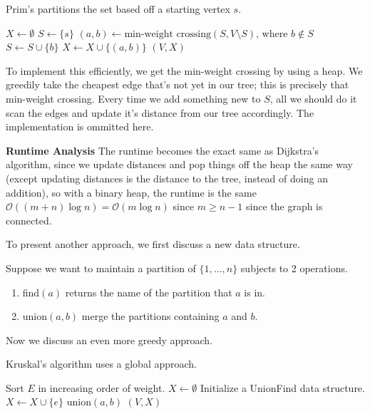 \begin{algothm}
    Prim's partitions the set based off a starting vertex $s$.
    \begin{algorithmic}
            \State $X \gets \emptyset$
            \State $S \gets \{s\}$
                \State $(a, b) \gets \text{min-weight crossing} (S, V\setminus S)$, where $b \notin S$
                \State $S \gets S \cup \{b\}$
                \State $X \gets X \cup \{(a, b)\}$
            \EndFor
            \State \Return $(V, X)$
        \EndFunction
    \end{algorithmic}

    To implement this efficiently, we get the min-weight crossing by using a heap. We greedily take the cheapest edge that's
    not yet in our tree; this is precisely that min-weight crossing. Every time we add something new to $S$, all we should do it scan the edges and
    update it's distance from our tree accordingly. The implementation is ommitted here.

    \textbf{Runtime Analysis} The runtime becomes the exact same as Dijkstra's algorithm, since we update distances and pop things off the heap
    the same way (except updating distances is the distance to the tree, instead of doing an addition), so with a binary heap,
    the runtime is the same $\mathcal{O}((m + n) \log n) = \mathcal{O}(m \log n)$ since $m \geq n - 1$ since the graph is connected.
\end{algothm}

To present another approach, we first discuss a new data structure.
\begin{note} 
    Suppose we want to maintain a partition of $\{1, \dots, n\}$ subjects to 2 operations.
    \begin{enumerate}
        \item find$(a)$ returns the name of the partition that $a$ is in.
        \item union$(a, b)$ merge the partitions containing $a$ and $b$.
    \end{enumerate}
\end{note}

Now we discuss an even more greedy approach.

\begin{algothm}
    Kruskal's algorithm uses a global approach.
    \begin{algorithmic}
            \State Sort $E$ in increasing order of weight.
            \State $X \gets \emptyset$
            \State Initialize a UnionFind data structure.
                    \State $X \gets X \cup \{e\}$
                    \State union$(a, b)$
                \EndIf
            \EndFor
            \State \Return $(V, X)$
        \EndFunction
    \end{algorithmic}
\end{algothm}